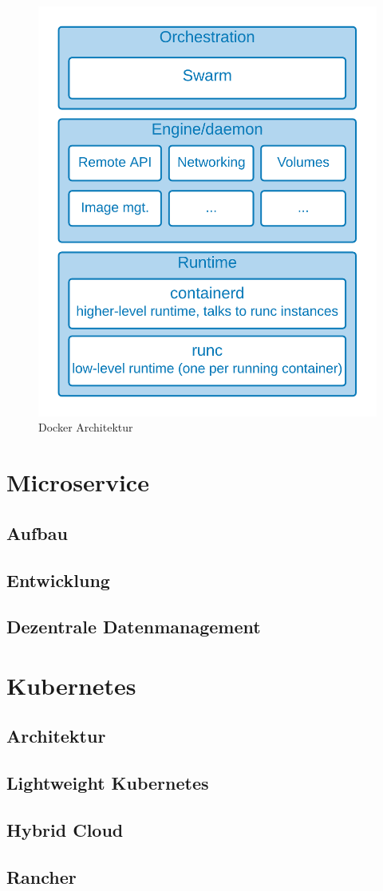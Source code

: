 \begin{figure}
    \centering
    \includegraphics[width=0.5\columnwidth]{images/DockerArch.png}
    \caption{Docker Architektur \protect\cite{dockerdeep}}
    \label{fig:dockerarch}
\end{figure}

\section{Microservice}
\subsection{Aufbau}
\subsection{Entwicklung}
\subsection{Dezentrale Datenmanagement}


\section{Kubernetes}
\subsection{Architektur}
\subsection{Lightweight Kubernetes}
\subsection{Hybrid Cloud}
\subsection{Rancher}



